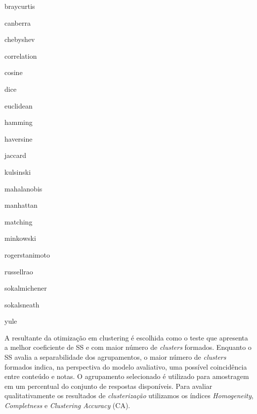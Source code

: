 \begin{itemize}
\begin{multicols}{4}
  \item braycurtis
  \item canberra
  \item chebyshev
  \item correlation
  \item cosine
  \item dice
  \item euclidean
  \item hamming
  \item haversine
  \item jaccard
  \item kulsinski
  \item mahalanobis
  \item manhattan
  \item matching
  \item minkowski
  \item rogerstanimoto
  \item russellrao
  \item sokalmichener
  \item sokalsneath
  \item yule
  \end{multicols}
\end{itemize}

A resultante da otimização em clustering é escolhida como o teste que apresenta a melhor coeficiente de SS e com maior número de \textit{clusters} formados. Enquanto o SS avalia a separabilidade dos agrupamentos, o maior número de \textit{clusters} formados indica, na perspectiva do modelo avaliativo, uma possível coincidência entre conteúdo e notas. O agrupamento selecionado é utilizado para amostragem em um percentual do conjunto de respostas disponíveis. Para avaliar qualitativamente os resultados de \textit{clusterização} utilizamos os índices \textit{Homogeneity}, \textit{Completness} e \textit{Clustering Accuracy} (CA).

